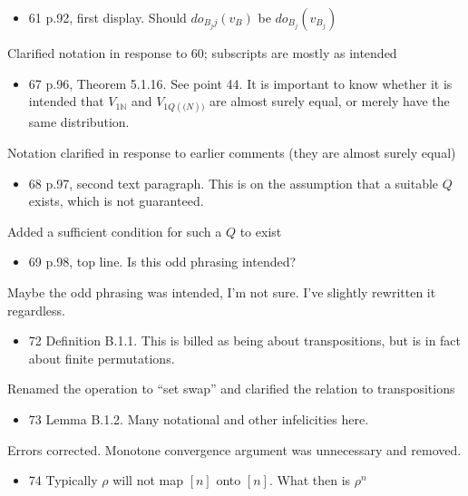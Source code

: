 \documentclass[12pt, a4paper]{article}
\begin{document}
\begin{itemize}
    \item 61 p.92, first display. Should $do_{B_j j}(v_B )$ be $do_{B_j} (v_{B_j} )$
\end{itemize}

Clarified notation in response to 60; subscripts are mostly as intended

\begin{itemize}
    \item 67 p.96, Theorem 5.1.16. See point 44. It is important to know whether it is intended that $V_{1 \mathbb{N}}$ and $V_{1Q( \mathbb(N) )}$ are almost surely equal, or merely have the same distribution.
\end{itemize}

Notation clarified in response to earlier comments (they are almost surely equal)

\begin{itemize}
    \item 68 p.97, second text paragraph. This is on the assumption that a suitable $Q$ exists, which is not guaranteed.
\end{itemize}
 
Added a sufficient condition for such a $Q$ to exist

\begin{itemize}
    \item 69 p.98, top line. Is this odd phrasing intended?
\end{itemize}
 
Maybe the odd phrasing was intended, I'm not sure. I've slightly rewritten it regardless.

\begin{itemize}
    \item 72 Definition B.1.1. This is billed as being about transpositions,
but is in fact about finite permutations.
\end{itemize}

Renamed the operation to ``set swap'' and clarified the relation to transpositions

\begin{itemize}
    \item 73 Lemma B.1.2. Many notational and other infelicities here.
\end{itemize}
 
Errors corrected. Monotone convergence argument was unnecessary and removed.

\begin{itemize}
    \item 74 Typically $\rho$ will not map $[n]$ onto $[n]$. What then is $\rho^n$
\end{itemize}
 
\end{document}

